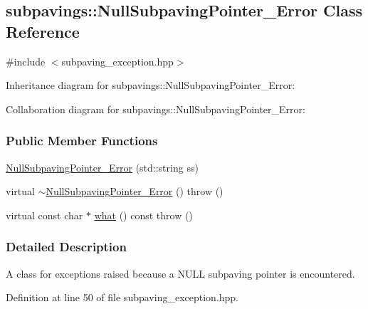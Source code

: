 \hypertarget{classsubpavings_1_1NullSubpavingPointer__Error}{\subsection{subpavings\-:\-:\-Null\-Subpaving\-Pointer\-\_\-\-Error \-Class \-Reference}
\label{classsubpavings_1_1NullSubpavingPointer__Error}
}


{\ttfamily \#include $<$subpaving\-\_\-exception.\-hpp$>$}



\-Inheritance diagram for subpavings\-:\-:\-Null\-Subpaving\-Pointer\-\_\-\-Error\-:


\-Collaboration diagram for subpavings\-:\-:\-Null\-Subpaving\-Pointer\-\_\-\-Error\-:
\subsubsection*{\-Public \-Member \-Functions}
\begin{DoxyCompactItemize}
\item 
\hyperlink{classsubpavings_1_1NullSubpavingPointer__Error_ab2b36850bcad56817956c2d875741ac2}{\-Null\-Subpaving\-Pointer\-\_\-\-Error} (std\-::string ss)
\item 
virtual \hyperlink{classsubpavings_1_1NullSubpavingPointer__Error_a377ebbaec256da0087c36251a373f51c}{$\sim$\-Null\-Subpaving\-Pointer\-\_\-\-Error} ()  throw ()
\item 
virtual const char $\ast$ \hyperlink{classsubpavings_1_1NullSubpavingPointer__Error_a835601a3476619553d97e3d9e1acfdd3}{what} () const   throw ()
\end{DoxyCompactItemize}


\subsubsection{\-Detailed \-Description}
\-A class for exceptions raised because a \-N\-U\-L\-L subpaving pointer is encountered. 

\-Definition at line 50 of file subpaving\-\_\-exception.\-hpp.



